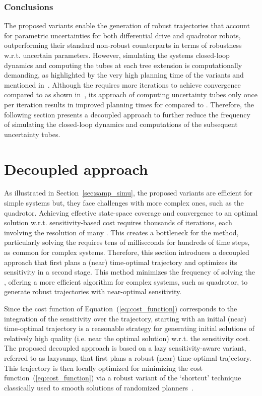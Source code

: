 \subsubsection{Conclusions}

The proposed  variants enable the generation of robust trajectories that account for parametric uncertainties for both differential drive and quadrotor robots, outperforming their standard non-robust counterparts in terms of robustness w.r.t. uncertain parameters.
However, simulating the systems closed-loop dynamics and computing the tubes at each tree extension is computationally demanding, as highlighted by the very high planning time of the  variants and mentioned in~\cite{cTognon}.
Although the  requires more iterations to achieve convergence compared to  as shown in~\cite{cSST}, its approach of computing uncertainty tubes only once per iteration results in improved planning times for  compared to .
Therefore, the following section presents a decoupled approach to further reduce the frequency of simulating the closed-loop dynamics and computations of the subsequent uncertainty tubes.

\section{Decoupled approach}\label{sec:decoupled}

As illustrated in Section~\ref{sec:samp_simu}, the proposed  variants are efficient for simple systems but, they face challenges with more complex ones, such as the quadrotor. 
Achieving effective state-space coverage and convergence to an optimal solution w.r.t. sensitivity-based cost requires thousands of iterations, each involving the resolution of many . 
This creates a bottleneck for the method, particularly solving the  requires tens of milliseconds for hundreds of time steps, as common for complex systems.
Therefore, this section introduces a decoupled approach that first plans a (near) time-optimal trajectory and optimizes its sensitivity in a second stage.
This method minimizes the frequency of solving the , offering a more efficient algorithm for complex systems, such as quadrotor, to generate robust trajectories with near-optimal sensitivity.

Since the cost function of Equation~(\ref{eq:cost_function}) corresponds to the integration of the sensitivity over the trajectory, starting with an initial (near) time-optimal trajectory is a reasonable strategy for generating initial solutions of relatively high quality (i.e. near the optimal solution) w.r.t. the sensitivity cost.
The proposed decoupled approach is based on a lazy sensitivity-aware variant, referred to as \gls{lazysamp}, that first plans a robust (near) time-optimal trajectory.
This trajectory is then locally optimized for minimizing the cost function~(\ref{eq:cost_function}) via a robust variant of the `shortcut' technique classically used to smooth solutions of randomized planners~\cite{cShortcut}. 

